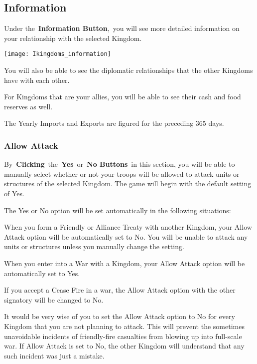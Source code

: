 \subsection{Information}

Under the \textbf{Information Button}, you will see more detailed information on your relationship with the selected Kingdom.

\begin{center}
	\texttt{[image: Ikingdoms\_information]}
\end{center}

You will also be able to see the diplomatic relationships that the other Kingdoms have with each other.

For Kingdoms that are your allies, you will be able to see their cash and food reserves as well.

The Yearly Imports and Exports are figured for the preceding 365 days.

\subsubsection{Allow Attack}


By \textbf{Clicking} the \textbf{Yes} or \textbf{No Buttons} in this section, you will be able to manually select whether or not your troops will be allowed to attack units or structures of the selected Kingdom. The game will begin with the default setting of Yes.

The Yes or No option will be set automatically in the following situations:

\begin{adjustwidth}{1cm}{}

	
When you form a Friendly or Alliance Treaty with another Kingdom, your Allow Attack option will be automatically set to No. You will be unable to attack any units or structures unless you manually change the setting.

When you enter into a War with a Kingdom, your Allow Attack option will be automatically set to Yes.

If you accept a Cease Fire in a war, the Allow Attack option with the other signatory will be changed to No.
\end{adjustwidth}

It would be very wise of you to set the Allow Attack option to No for every Kingdom that you are not planning to attack. This will prevent the sometimes unavoidable incidents of friendly-fire casualties from blowing up into full-scale war. If Allow Attack is set to No, the other Kingdom will understand that any such incident was just a mistake.

